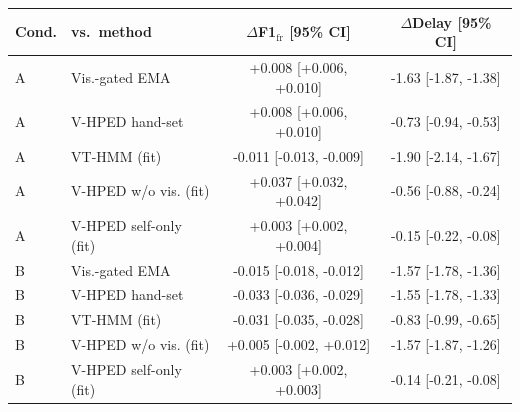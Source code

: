 \begin{tabular}{@{}llcc@{}}
\toprule
Cond. & vs.\ method & $\Delta$F1$_{\mathrm{fr}}$ [95\% CI] & $\Delta$Delay [95\% CI] \\
\midrule
A & Vis.-gated EMA & +0.008 [+0.006, +0.010] & -1.63 [-1.87, -1.38] \\
A & V-HPED hand-set & +0.008 [+0.006, +0.010] & -0.73 [-0.94, -0.53] \\
A & VT-HMM (fit) & -0.011 [-0.013, -0.009] & -1.90 [-2.14, -1.67] \\
A & V-HPED w/o vis. (fit) & +0.037 [+0.032, +0.042] & -0.56 [-0.88, -0.24] \\
A & V-HPED self-only (fit) & +0.003 [+0.002, +0.004] & -0.15 [-0.22, -0.08] \\
B & Vis.-gated EMA & -0.015 [-0.018, -0.012] & -1.57 [-1.78, -1.36] \\
B & V-HPED hand-set & -0.033 [-0.036, -0.029] & -1.55 [-1.78, -1.33] \\
B & VT-HMM (fit) & -0.031 [-0.035, -0.028] & -0.83 [-0.99, -0.65] \\
B & V-HPED w/o vis. (fit) & +0.005 [-0.002, +0.012] & -1.57 [-1.87, -1.26] \\
B & V-HPED self-only (fit) & +0.003 [+0.002, +0.003] & -0.14 [-0.21, -0.08] \\
\bottomrule
\end{tabular}

